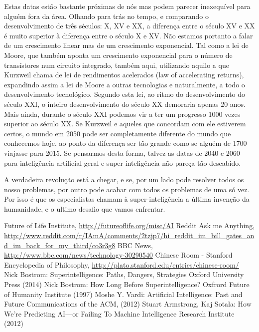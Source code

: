 \documentclass[runningheads,a4paper]{llncs}
\begin{document}
Estas datas estão bastante próximas de nós mas podem parecer inexequível para alguém fora da área. Olhando para trás no tempo, e comparando o desenvolvimento de três séculos: X, XV e XX, a diferença entre o século XV e XX é muito superior à diferença entre o século X e XV\@.
Não estamos portanto a falar de um crescimento linear mas de um crescimento exponencial. Tal como a lei de Moore, que também aponta um crescimento exponencial para o número de transístores num circuito integrado, também aqui, utilizando aquilo a que Kurzweil chama de lei de rendimentos acelerados
(law of accelerating returns), expandindo assim a lei de Moore a outras tecnologias e naturalmente, a todo o desenvolvimento tecnológico. Segundo esta lei, ao ritmo do desenvolvimento do século XXI, o inteiro desenvolvimento do século XX demoraria apenas 20 anos. Mais ainda, durante o século XXI podemos vir a ter um progresso 1000 vezes superior ao século XX\@. Se Kurzweil e aqueles que concordam com ele estiverem certos, o mundo em 2050 pode ser completamente diferente do mundo que conhecemos hoje, ao ponto da diferença ser tão grande como se alguém de 1700 viajasse para 2015. Se pensarmos desta forma, talvez as datas de 2040 e 2060 para inteligência artificial geral e super-inteligência não pareça tão descabido.

A verdadeira revolução está a chegar, e se, por um lado pode resolver todos os nosso problemas, por outro pode acabar com todos os problemas de uma só vez. Por isso é que os especialistas chamam à super-inteligência a última invenção da humanidade, e o ultimo desafio que vamos enfrentar.

\begin{thebibliography}{4}

   Future of Life Institute, \url{http://futureoflife.org/misc/AI}
   Reddit Ask me Anything, \url{http://www.reddit.com/r/IAmA/comments/2tzjp7/hi_reddit_im_bill_gates_and_im_back_for_my_third/co3r3g8}
   BBC News, \url{http://www.bbc.com/news/technology-30290540}
   Chinese Room - Stanford Encyclopedia of Philosophy, \url{http://plato.stanford.edu/entries/chinese-room/}
   Nick Bostrom:
    Superintelligence: Paths, Dangers, Strategies
    Oxford University Press (2014)
   Nick Bostrom:
    How Long Before Superintelligence?
    Oxfrord Future of Humanity Institute (1997)
   Moshe Y. Vardi:
    Artificial Intelligence: Past and Future
    Communications of the ACM, (2012)
   Stuart Armstrong, Kaj Sotala:
    How We’re Predicting AI—or Failing To
    Machine Intelligence Research Institute (2012)

\end{thebibliography}
\end{document}
